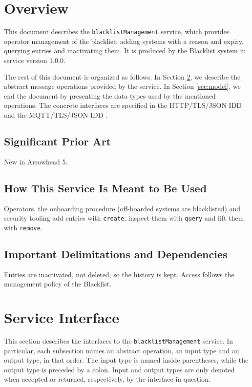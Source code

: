 \documentclass[a4paper]{arrowhead}
\begin{document}
\section{Overview}
\label{sec:overview}

This document describes the \texttt{blacklist\allowbreak{}Management} service, which provides operator management of the blacklist: adding systems with a reason and expiry, querying entries and inactivating them.
It is produced by the Blacklist system \cite{bl-sysd} in service version 1.0.0.

The rest of this document is organized as follows.
In Section \ref{sec:operations}, we describe the abstract message operations provided by the service.
In Section \ref{sec:model}, we end the document by presenting the data types used by the mentioned operations.
The concrete interfaces are specified in the HTTP/TLS/JSON IDD \cite{bl-blacklistManagement-http-idd} and the MQTT/TLS/JSON IDD \cite{bl-blacklistManagement-mqtt-idd}.

\subsection{Significant Prior Art}

New in Arrowhead 5.

\subsection{How This Service Is Meant to Be Used}

Operators, the onboarding procedure (off-boarded systems are blacklisted) and security tooling add entries with \texttt{create}, inspect them with \texttt{query} and lift them with \texttt{remove}.

\subsection{Important Delimitations and Dependencies}
\label{sec:delimitations}

Entries are inactivated, not deleted, so the history is kept. Access follows the management policy of the Blacklist.

\newpage

\section{Service Interface}
\label{sec:operations}

This section describes the interfaces to the \texttt{blacklist\allowbreak{}Management} service.
In particular, each subsection names an abstract operation, an input type and an output type, in that order.
The input type is named inside parentheses, while the output type is preceded by a colon.
Input and output types are only denoted when accepted or returned, respectively, by the interface in question.
\end{document}
